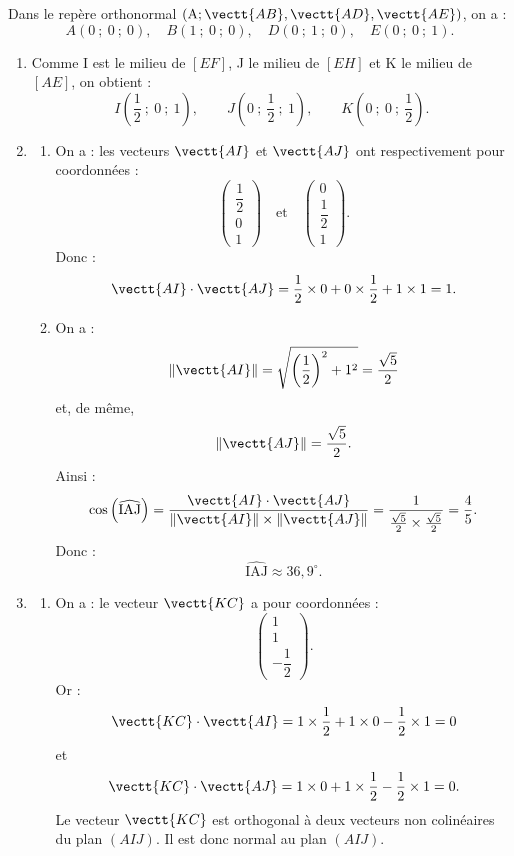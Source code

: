 Dans le repère orthonormal $\left(\mathrm{A};\vectt{AB},\vectt{AD},\vectt{AE}\right)$, on a :
\[
A(0~;~0~;~0),\quad B(1~;~0~;~0),\quad D(0~;~1~;~0),\quad E(0~;~0~;~1).
\]

\begin{enumerate}
	\item Comme I est le milieu de $[EF]$, J le milieu de $[EH]$ et K le milieu de $[AE]$, on obtient :
	\[
	I\left(\dfrac12~;~0~;~1\right),\qquad
	J\left(0~;~\dfrac12~;~1\right),\qquad
	K\left(0~;~0~;~\dfrac12\right).
	\]

	\item \begin{enumerate}
		\item On a :
		les vecteurs $\vectt{AI}$ et $\vectt{AJ}$ ont respectivement pour coordonnées :
		\[
		\begin{pmatrix}\dfrac12\\0\\1\end{pmatrix}
		\quad\text{et}\quad
		\begin{pmatrix}0\\\dfrac12\\1\end{pmatrix}.
		\]
		Donc :
		\[
		\vectt{AI}\cdot\vectt{AJ}
		=\dfrac12\times 0+0\times\dfrac12+1\times 1=1.
		\]

		\item On a :
		\[
		\|\vectt{AI}\|=\sqrt{\left(\dfrac12\right)^2+1^2}=\dfrac{\sqrt5}{2}
		\]
		et, de même,
		\[
		\|\vectt{AJ}\|=\dfrac{\sqrt5}{2}.
		\]
		Ainsi :
		\[
		\cos\left(\widehat{\mathrm{IAJ}}\right)
		=\dfrac{\vectt{AI}\cdot\vectt{AJ}}{\|\vectt{AI}\|\times \|\vectt{AJ}\|}
		=\dfrac{1}{\frac{\sqrt5}{2}\times \frac{\sqrt5}{2}}
		=\dfrac45.
		\]
		Donc :
		\[
		\widehat{\mathrm{IAJ}}\approx 36,9^\circ.
		\]
	\end{enumerate}

	\item \begin{enumerate}
		\item On a :
		le vecteur $\vectt{KC}$ a pour coordonnées :
		\[
		\begin{pmatrix}1\\1\\-\dfrac12\end{pmatrix}.
		\]
		Or :
		\[
		\vectt{KC}\cdot\vectt{AI}
		=1\times\dfrac12+1\times 0-\dfrac12\times 1=0
		\]
		et
		\[
		\vectt{KC}\cdot\vectt{AJ}
		=1\times 0+1\times\dfrac12-\dfrac12\times 1=0.
		\]
		Le vecteur $\vectt{KC}$ est orthogonal à deux vecteurs non colinéaires du plan $(AIJ)$.
		Il est donc normal au plan $(AIJ)$.


\end{enumerate}
\end{enumerate}
